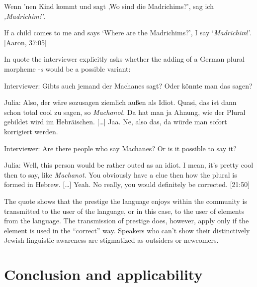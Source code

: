 \documentclass[output=paper]{langscibook}
\begin{document}
\ea%
\label{ex:jahns:7}


Wenn 'nen Kind kommt und sagt ‚Wo sind die Madrichims?', sag ich \textit{{}‚Madrichim!'}. 


If a child comes to me and says `Where are the Madrichims?’, I say ‘\textit{Madrichim}!’. [Aaron, 37:05]
\z

In quote  the interviewer explicitly asks whether the adding of a German plural morpheme -\textit{s} would be a possible variant:

\ea%
\label{ex:jahns:8}


Interviewer:  Gibts auch jemand der Machanes sagt? Oder könnte \hspace*{20mm} man das sagen?


Julia:  \hspace*{11mm} Also, der wäre sozusagen ziemlich außen als Idiot. Quasi, \hspace*{20mm} das ist dann schon total cool zu sagen, so                  \textit{Machanot}. Da hat \hspace*{20mm} man ja Ahnung, wie der Plural gebildet wird im \hspace*{20mm} Hebräischen. […] Jaa. Ne, also das, da würde man sofort \hspace*{20mm} korrigiert werden. 


Interviewer:   Are there people who say Machanes? Or is it possible to say \hspace*{20mm} it?


Julia:  \hspace*{11mm} Well, this person would be rather outed as an idiot. I mean, \hspace*{20mm} it’s pretty cool then to say, like \textit{Machanot}. You obviously \hspace*{20mm} have a clue then how the plural is formed in Hebrew. […] \hspace*{20mm} Yeah. No really, you would definitely be corrected. [21:50]
\z

The quote shows that the prestige the language enjoys within the community is transmitted to the user of the language, or in this case, to the user of elements from the language. The transmission of prestige does, however, apply only if the element is used in the “correct” way. Speakers who can’t show their distinctively Jewish linguistic awareness are stigmatized as outsiders or newcomers.

\section{Conclusion and applicability}
\end{document}
